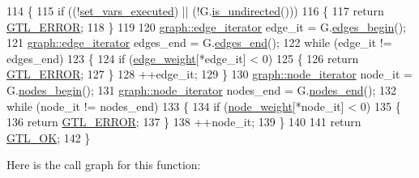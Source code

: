 \begin{DoxyCode}
114 \{
115     \textcolor{keywordflow}{if} ((!\mbox{\hyperlink{classfm__partition_a58edb78c4da479cd790da1eed1a30eab}{set\_vars\_executed}}) || (!G.\mbox{\hyperlink{classgraph_aba427ff8ba0f70c68416ec1351344cd8}{is\_undirected}}()))
116     \{
117     \textcolor{keywordflow}{return} \mbox{\hyperlink{classalgorithm_af1a0078e153aa99c24f9bdf0d97f6710a6fcf574690bbd6cf710837a169510dd7}{GTL\_ERROR}};
118     \}
119 
120     \mbox{\hyperlink{classgraph_a818d3766018eb0af91d520ce2150203c}{graph::edge\_iterator}} edge\_it = G.\mbox{\hyperlink{classgraph_a7ba35a4c4e8343ffb27ed6d9703c6f18}{edges\_begin}}();
121     \mbox{\hyperlink{classgraph_a818d3766018eb0af91d520ce2150203c}{graph::edge\_iterator}} edges\_end = G.\mbox{\hyperlink{classgraph_aea8d7f976b85b6137f52d915e26639f6}{edges\_end}}();
122     \textcolor{keywordflow}{while} (edge\_it != edges\_end)
123     \{
124     \textcolor{keywordflow}{if} (\mbox{\hyperlink{classfm__partition_adfe6147ba3f9c785f613b472f950595f}{edge\_weight}}[*edge\_it] < 0)
125     \{
126         \textcolor{keywordflow}{return} \mbox{\hyperlink{classalgorithm_af1a0078e153aa99c24f9bdf0d97f6710a6fcf574690bbd6cf710837a169510dd7}{GTL\_ERROR}};
127     \}
128     ++edge\_it;
129     \}
130     \mbox{\hyperlink{classgraph_a2cb374b84c133ce13f94e73c3e5da7fa}{graph::node\_iterator}} node\_it = G.\mbox{\hyperlink{classgraph_aec053a4b509d1be804237a80044c54c0}{nodes\_begin}}();
131     \mbox{\hyperlink{classgraph_a2cb374b84c133ce13f94e73c3e5da7fa}{graph::node\_iterator}} nodes\_end = G.\mbox{\hyperlink{classgraph_abbf9c0cb5629e98e1142254911238173}{nodes\_end}}();
132     \textcolor{keywordflow}{while} (node\_it != nodes\_end)
133     \{
134     \textcolor{keywordflow}{if} (\mbox{\hyperlink{classfm__partition_ae1ba643b4bd6721075ab7b608bcf3cd6}{node\_weight}}[*node\_it] < 0)
135     \{
136         \textcolor{keywordflow}{return} \mbox{\hyperlink{classalgorithm_af1a0078e153aa99c24f9bdf0d97f6710a6fcf574690bbd6cf710837a169510dd7}{GTL\_ERROR}};
137     \}
138     ++node\_it;
139     \}
140 
141     \textcolor{keywordflow}{return} \mbox{\hyperlink{classalgorithm_af1a0078e153aa99c24f9bdf0d97f6710a5114c20e4a96a76b5de9f28bf15e282b}{GTL\_OK}};
142 \}
\end{DoxyCode}
Here is the call graph for this function\+:\nopagebreak
